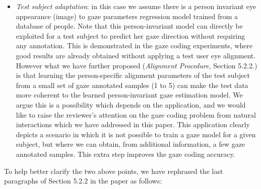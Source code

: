 {\begin{itemize}
\item {\em Test subject adaptation}: in this case we assume there is a person invariant eye appearance (image) to gaze parameters regression model 
trained from a database of people.
%
Note that this person-invariant model can directly be exploited for a test subject to predict her gaze direction without requiring any annotation.
%
This is demonstrated in the gaze coding experiments, where good results are already obtained without applying a  test user eye alignment.
%
However what we have further proposed ({\em Alignment Procedure}, Section 5.2.2.) is that learning the person-specific alignment 
parameters of the test subject from a small set of gaze annotated samples (1 to 5) can make the test data
more coherent to the learned person-invariant gaze estimation model. 
%
We argue this is a possibility which depends on the application, and  we would like to raise the reviewer's attention on 
the gaze coding problem from natural interactions which we have addressed in this paper.
%
This application clearly depicts a scenario in which it is not possible to train a gaze model for a given subject, 
 but where we can obtain, from additional information, a few gaze annotated samples. This extra step improves the gaze coding accuracy.
\end{itemize}

\qquad

To help better clarify the two above points, we have rephrased the last paragraphs of  Section 5.2.2 in the paper as follows:

}
